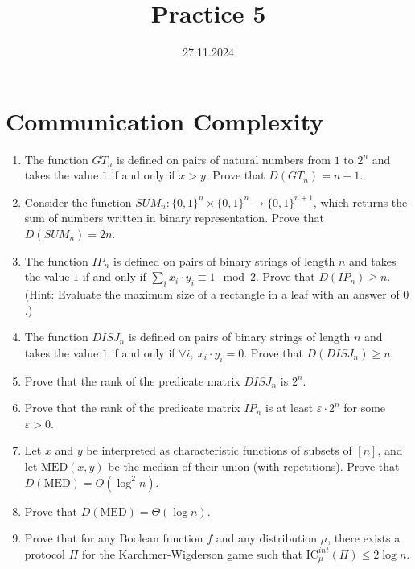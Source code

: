 \documentclass[a4paper,14pt]{extarticle}
\title{Practice 5}
\date{27.11.2024}
\author{}
\begin{document}
\maketitle

\section*{Communication Complexity}

\begin{enumerate}
    \item
    The function $GT_n$ is defined on pairs of natural numbers from $1$ to $2^n$ and takes the value $1$ if and only if $x > y$. Prove that $D(GT_n) = n+1$.

    \item
    Consider the function $SUM_n : \{0,1\}^n \times \{0,1\}^n \to \{0,1\}^{n+1}$, which returns the sum of numbers written in binary representation. Prove that $D(SUM_n) = 2n$.

    \item
    The function $IP_n$ is defined on pairs of binary strings of length $n$ and takes the value $1$ if and only if $\sum_i x_i\cdot y_i \equiv 1 \mod 2$. Prove that $D(IP_n) \geq n$.
    (Hint: Evaluate the maximum size of a rectangle in a leaf with an answer of $0$.)

    \item The function $DISJ_n$ is defined on pairs of binary strings of length $n$ and takes the value $1$ if and only if $\forall i,\ x_i\cdot y_i = 0$. Prove that $D(DISJ_n) \geq n$.


    \item
    Prove that the rank of the predicate matrix $DISJ_n$ is $2^n$.

    \item
    Prove that the rank of the predicate matrix $IP_n$ is at least $\varepsilon \cdot 2^n$ for some $\varepsilon > 0$.

    \item
    Let $x$ and $y$ be interpreted as characteristic functions of subsets of $[n]$, and let $\mathrm{MED}(x, y)$ be the median of their union (with repetitions).
    Prove that $D(\mathrm{MED}) = O(\log^2{n})$.

    \item
    Prove that $D(\mathrm{MED}) = \Theta(\log{n})$.


        \item
        Prove that for any Boolean function $f$ and any distribution $\mu$, there exists a protocol $\Pi$ for the Karchmer-Wigderson game such that $\mathrm{IC}^{int}_\mu(\Pi) \leq 2\log n$.


\end{enumerate}
\end{document}
